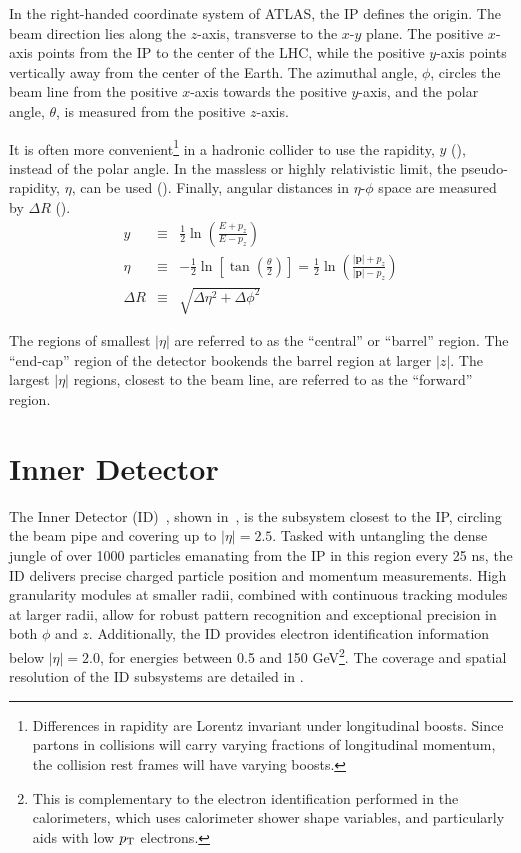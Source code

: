 In the right-handed coordinate system of ATLAS, the IP defines the origin. The beam direction lies along the $z$-axis, transverse to the $x$-$y$ plane. The positive $x$-axis points from the IP to the center of the LHC, while the positive $y$-axis points vertically away from the center of the Earth. The azimuthal angle, $\phi$, circles the beam line from the positive $x$-axis towards the positive $y$-axis, and the polar angle, $\theta$, is measured from the positive $z$-axis.  

It is often more convenient\footnote{
    Differences in rapidity are Lorentz invariant under longitudinal boosts. Since partons in collisions will carry varying fractions of longitudinal momentum, the collision rest frames will have varying boosts. 
} in a hadronic collider to use the rapidity, $y$ (\Eqn{\ref{eqn:rapidity}}), instead of the polar angle. In the massless or highly relativistic limit, the pseudo-rapidity, $\eta$, can be used (\Eqn{\ref{eqn:pseudorapidity}}). Finally, angular distances in $\eta$-$\phi$ space are measured by $\Delta R$ (\Eqn{\ref{eqn:deltar}}).
\begin{eqnarray}
	y &\equiv& \frac{1}{2}\ln\left(\frac{E+p_{z}}{E-p_{z}}\right) \label{eqn:rapidity}  \\
	\eta &\equiv& - \frac{1}{2}\ln \left[\tan\left(\frac{\theta}{2}\right)\right]= \frac{1}{2}\ln\left(\frac{|\boldsymbol{p}|+p_{z}}{|\boldsymbol{p}|-p_{z}}\right) \label{eqn:pseudorapidity} \\
	\Delta R &\equiv& \sqrt{\Delta \eta ^2 +\Delta \phi ^2} \label{eqn:deltar}
\end{eqnarray}

The regions of smallest $|\eta|$ are referred to as the ``central'' or ``barrel'' region. The ``end-cap'' region of the detector bookends the barrel region at larger $|z|$. The largest $|\eta|$ regions, closest to the beam line, are referred to as the ``forward'' region.

\section{Inner Detector}
\label{ch:atlas:id}

The Inner Detector (ID)~\cite{ID_TDR,ID_TDR2,IBL_TDR, ATL-PHYS-PUB-2009-002}, shown in~\Fig{\ref{fig:atlas_id}}, is the subsystem closest to the IP, circling the beam pipe and covering up to $|\eta| = 2.5$. Tasked with untangling the dense jungle of over 1000 particles emanating from the IP in this region every 25 ns, the ID delivers precise charged particle position and momentum measurements. High granularity modules at smaller radii, combined with continuous tracking modules at larger radii, allow for robust pattern recognition and exceptional precision in both $\phi$ and $z$. Additionally, the ID provides electron identification information below $|\eta|=2.0$, for energies between 0.5 and 150 GeV\footnote{
    This is complementary to the electron identification performed in the calorimeters, which uses calorimeter shower shape variables, and particularly aids with low $p_{\rm T}$ electrons.
}. The coverage and spatial resolution of the ID subsystems are detailed in \Tab{\ref{tab:ID_res}}.


